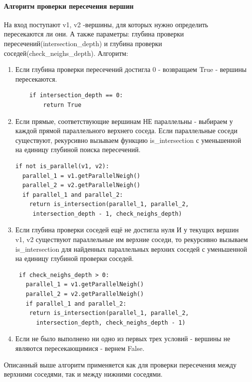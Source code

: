 \paragraph{Алгоритм проверки пересечения вершин}
\label{intersection}
На вход поступают v1, v2 -вершины, для которых нужно определить пересекаются ли они.
А также параметры: глубина проверки пересечений(intersection\_depth) и глубина проверки соседей(check\_neighs\_depth).
\newline
Алгоритм:
\begin{enumerate}
	\item Если глубина проверки пересечений достигла 0 - возвращаем True - вершины пересекаются.
	\begin{lstlisting}
    if intersection_depth == 0:
		return True
	\end{lstlisting}
	\item Если прямые, соответствующие вершинам НЕ параллельны - выбираем у каждой прямой параллельного верхнего соседа. Если параллельные соседи существуют, рекурсивно вызываем функцию is\_intersection с уменьшенной на единицу глубиной поиска пересечений.
	\begin{lstlisting}
if not is_parallel(v1, v2):
  parallel_1 = v1.getParallelNeigh()
  parallel_2 = v2.getParallelNeigh()
  if parallel_1 and parallel_2:
    return is_intersection(parallel_1, parallel_2,
     intersection_depth - 1, check_neighs_depth)
	\end{lstlisting}
	\item Если глубина проверки соседей ещё не достигла нуля И у текущих вершин v1, v2 существуют параллельные им верхние соседи, то рекурсивно вызываем is\_intersection для найденных параллельных верхних соседей с уменьшенной на единицу глубиной проверки соседей.
	\begin{lstlisting}
 if check_neighs_depth > 0:
   parallel_1 = v1.getParallelNeigh()
   parallel_2 = v2.getParallelNeigh()
   if parallel_1 and parallel_2:
    return is_intersection(parallel_1, parallel_2,
      intersection_depth, check_neighs_depth - 1)
	\end{lstlisting}
	\item Если не было выполнено ни одно из первых трех условий - вершины не являются пересекающимися - вернем False.
\end{enumerate}
Описанный выше алгоритм применяется как для проверки пересечения между верхними соседями, так и между нижними соседями. 

